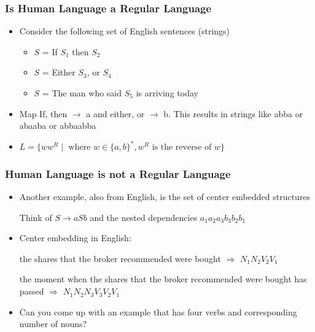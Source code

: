 \documentclass[compress,color=usenames]{beamer}
\begin{document}
\begin{frame}
\frametitle{Is Human Language a Regular Language}

\begin{itemize}
\item Consider the following set of English sentences (strings)

\begin{itemize}
\item $S$ = If $S_1$ then $S_2$

\item $S$ = Either $S_3$, or $S_4$


\item $S$ = The man who said $S_5$ is arriving today
\end{itemize}


\item Map If, then $\rightarrow$ a and either, or $\rightarrow$ b. This results in strings like abba or
abaaba or abbaabba

\item $L = \{ww^R \mid \mbox{ where } w \in \{a, b\}^*, w^R \mbox{ is the reverse of } w\}$

\end{itemize}

\end{frame}

\begin{frame}
\frametitle{Human Language is not a Regular Language}

\begin{itemize}
\item Another example, also from English, is the set of center embedded
structures


Think of $S \rightarrow a S b$ and the nested dependencies $a_1a_2a_3b_3b_2b_1$


\item Center embedding in English:

the shares that the broker recommended were bought $\Rightarrow$ $N_1N_2V_2V_1$


the moment when the shares that the broker recommended were bought
has passed $\Rightarrow$ $N_1N_2N_3V_3V_2V_1$

\item Can you come up with an example that has four verbs and corresponding
number of nouns?
\end{itemize}

\end{frame}
\end{document}
